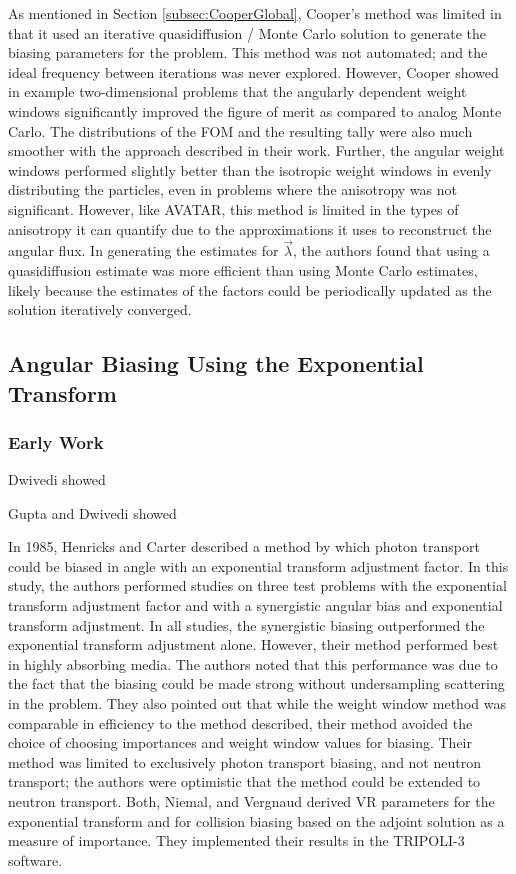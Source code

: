 As mentioned in Section \ref{subsec:CooperGlobal}, Cooper's method was limited in that it used an
iterative quasidiffusion / Monte Carlo solution to generate the biasing parameters for
the problem. This method was not automated; and the ideal frequency between iterations
was never explored. However, Cooper showed in example two-dimensional problems
that the angularly dependent weight windows
significantly improved the figure of merit as compared to analog Monte Carlo.
The distributions of the FOM and the resulting tally were also much smoother
with the approach described in their work.
Further, the
angular weight windows performed slightly better than the isotropic weight windows in
evenly distributing the particles, even in problems where the anisotropy was not
significant. However, like
AVATAR, this method is limited in the types of anisotropy it can quantify due to
the approximations it uses to reconstruct the angular flux. In generating the
estimates for $\vec{\lambda}$, the authors found that using a quasidiffusion
estimate was more efficient than using Monte Carlo estimates, likely because the
estimates of the factors could be periodically updated as the solution
iteratively converged.
%
%

\subsection{Angular Biasing Using the Exponential Transform}

\subsubsection{Early Work}

Dwivedi \cite{dwivedi_new_1982} showed

Gupta and Dwivedi \cite{gupta_sampling_1985} showed

In 1985, Henricks and Carter \cite{hendricks_anisotropic_1985} described a
method by which
photon transport could be biased in angle with an exponential transform
adjustment factor.
In this study, the authors performed studies on three test problems with the
exponential
transform adjustment factor and with a synergistic angular bias and exponential
transform
adjustment.
In all studies, the synergistic biasing outperformed the exponential transform
adjustment
alone.
However, their method performed best in highly absorbing media.
The authors noted that this performance was due to the fact that the biasing
could be made
strong without undersampling scattering in the problem.
They also pointed out that while the weight window method was comparable in
efficiency to the
method described, their method avoided the choice of choosing importances and
weight window
values for biasing. Their method was limited to exclusively photon transport
biasing, and not
neutron transport; the authors were optimistic that the method could be extended
to neutron
transport.
Both, Niemal, and Vergnaud \cite{both_automated_1990} derived VR parameters for
the exponential transform and for collision biasing based on the adjoint
solution as a measure of importance. They implemented their results in the
TRIPOLI-3 software.

